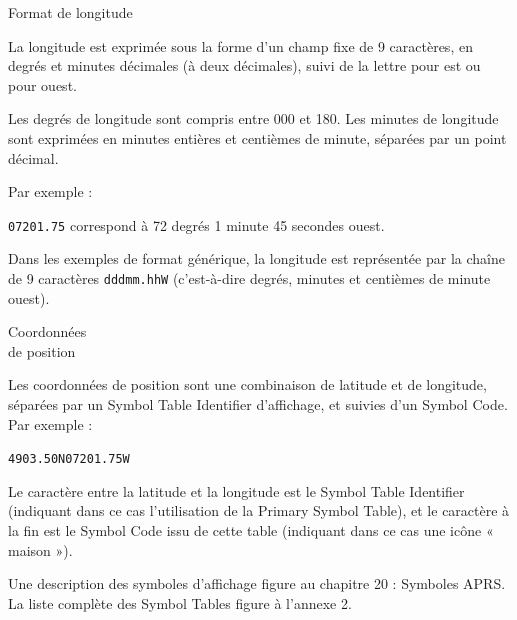 \begin{aprssideblock}{Format de longitude}
\label{format-de-longitude}
La longitude est exprimée sous la forme d'un champ fixe de 9 caractères,
en degrés et minutes décimales (à deux décimales), suivi de la lettre
 pour est ou  pour ouest.

Les degrés de longitude sont compris entre 000 et 180. Les minutes de
longitude sont exprimées en minutes entières et centièmes de minute,
séparées par un point décimal.

Par exemple :

\begin{aprsexample}
\texttt{07201.75} \exgap correspond à 72 degrés 1 minute
45 secondes ouest.
\end{aprsexample}

Dans les exemples de format générique, la longitude est représentée par
la chaîne de 9 caractères \texttt{dddmm.hhW} (c'est-à-dire degrés,
minutes et centièmes de minute ouest).
\end{aprssideblock}

\begin{aprssideblock}{Coordonnées\\de position}
\label{coordonnuxe9es-de-position}
Les coordonnées de position sont une combinaison de latitude et de
longitude, séparées par un Symbol Table Identifier d'affichage, et
suivies d'un Symbol Code. Par exemple :

\begin{aprsexample}
\texttt{4903.50N}\lit{/}\texttt{07201.75W}\lit{-}
\end{aprsexample}

Le caractère \lit{/} entre la latitude et la longitude est le Symbol
Table Identifier (indiquant dans ce cas l'utilisation de la Primary
Symbol Table), et le caractère \lit{-} à la fin est le Symbol Code issu
de cette table (indiquant dans ce cas une icône « maison »).

Une description des symboles d'affichage figure au chapitre 20 :
Symboles APRS. La liste complète des Symbol Tables figure à l'annexe 2.
\end{aprssideblock}

